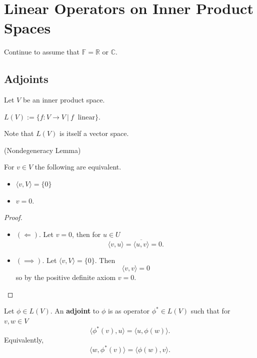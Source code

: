\section{Linear Operators on Inner Product Spaces}

Continue to assume that $\mathbb{F}=  \mathbb{R}$ or $\mathbb{C}$.
\subsection{Adjoints}

Let $V$ be an inner product space.

\begin{notation}
  $L(V) := \{ f : V \rightarrow V \ | \ f \ \text{ linear} \}$. 
\end{notation}
\noindent Note that $L(V)$ is itself a vector space.

\begin{lemma} (Nondegeneracy Lemma)

  For $v \in V$ the following are equivalent.

  \begin{itemize}
    \item $ \langle v, V \rangle = \{0\}$
    \item $v = 0$.
  \end{itemize}
\end{lemma}
\begin{proof} $ $
    \begin{itemize}
      \item $(\Leftarrow)$. Let $v = 0$, then for $u \in U$
        \[\langle v, u \rangle = \overline{ \langle u, v \rangle} = 0.\]
      \item $(\implies)$. Let $\langle v, V \rangle = \{0\}$. Then
        \[\langle v, v \rangle = 0\]
        so by the positive definite axiom $v = 0$.
    \end{itemize}
\end{proof}

\begin{definition}
  Let $\phi \in L(V)$. An {\bf adjoint} to $\phi$ is as operator $\phi^* \in L(V)$ such that for $v, w \in V$
  \[\langle \phi^*(v), u \rangle = \langle u, \phi(w) \rangle.\]
  Equivalently,
  \[\langle w, \phi^*(v) \rangle = \langle \phi(w), v \rangle.\]
\end{definition}

